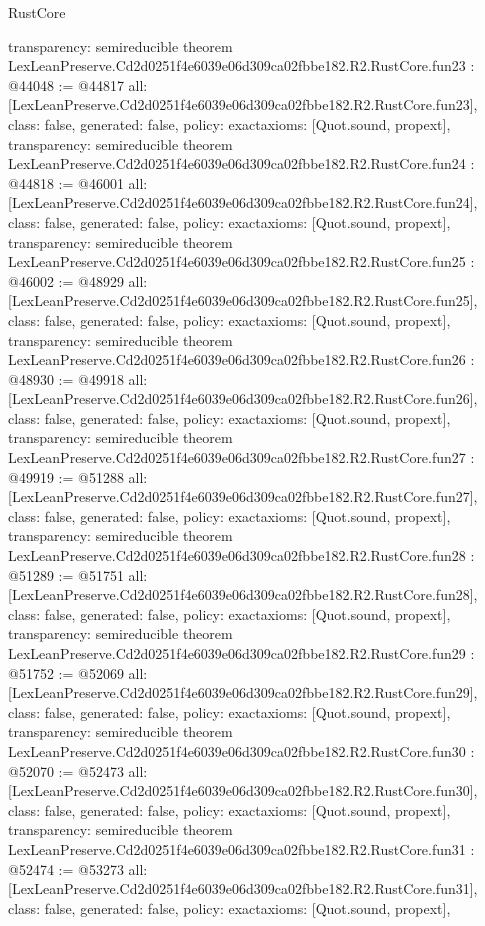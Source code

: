 \begin{lexlean}{RustCore}
\begin{coremodule}
{  transparency: semireducible
}
theorem LexLeanPreserve.Cd2d0251f4e6039e06d309ca02fbbe182.R2.RustCore.fun23 : @44048 := @44817 {
  all: [LexLeanPreserve.Cd2d0251f4e6039e06d309ca02fbbe182.R2.RustCore.fun23],
  class: false,
  generated: false,
  policy: exact{axioms: [Quot.sound, propext]},
  transparency: semireducible
}
theorem LexLeanPreserve.Cd2d0251f4e6039e06d309ca02fbbe182.R2.RustCore.fun24 : @44818 := @46001 {
  all: [LexLeanPreserve.Cd2d0251f4e6039e06d309ca02fbbe182.R2.RustCore.fun24],
  class: false,
  generated: false,
  policy: exact{axioms: [Quot.sound, propext]},
  transparency: semireducible
}
theorem LexLeanPreserve.Cd2d0251f4e6039e06d309ca02fbbe182.R2.RustCore.fun25 : @46002 := @48929 {
  all: [LexLeanPreserve.Cd2d0251f4e6039e06d309ca02fbbe182.R2.RustCore.fun25],
  class: false,
  generated: false,
  policy: exact{axioms: [Quot.sound, propext]},
  transparency: semireducible
}
theorem LexLeanPreserve.Cd2d0251f4e6039e06d309ca02fbbe182.R2.RustCore.fun26 : @48930 := @49918 {
  all: [LexLeanPreserve.Cd2d0251f4e6039e06d309ca02fbbe182.R2.RustCore.fun26],
  class: false,
  generated: false,
  policy: exact{axioms: [Quot.sound, propext]},
  transparency: semireducible
}
theorem LexLeanPreserve.Cd2d0251f4e6039e06d309ca02fbbe182.R2.RustCore.fun27 : @49919 := @51288 {
  all: [LexLeanPreserve.Cd2d0251f4e6039e06d309ca02fbbe182.R2.RustCore.fun27],
  class: false,
  generated: false,
  policy: exact{axioms: [Quot.sound, propext]},
  transparency: semireducible
}
theorem LexLeanPreserve.Cd2d0251f4e6039e06d309ca02fbbe182.R2.RustCore.fun28 : @51289 := @51751 {
  all: [LexLeanPreserve.Cd2d0251f4e6039e06d309ca02fbbe182.R2.RustCore.fun28],
  class: false,
  generated: false,
  policy: exact{axioms: [Quot.sound, propext]},
  transparency: semireducible
}
theorem LexLeanPreserve.Cd2d0251f4e6039e06d309ca02fbbe182.R2.RustCore.fun29 : @51752 := @52069 {
  all: [LexLeanPreserve.Cd2d0251f4e6039e06d309ca02fbbe182.R2.RustCore.fun29],
  class: false,
  generated: false,
  policy: exact{axioms: [Quot.sound, propext]},
  transparency: semireducible
}
theorem LexLeanPreserve.Cd2d0251f4e6039e06d309ca02fbbe182.R2.RustCore.fun30 : @52070 := @52473 {
  all: [LexLeanPreserve.Cd2d0251f4e6039e06d309ca02fbbe182.R2.RustCore.fun30],
  class: false,
  generated: false,
  policy: exact{axioms: [Quot.sound, propext]},
  transparency: semireducible
}
theorem LexLeanPreserve.Cd2d0251f4e6039e06d309ca02fbbe182.R2.RustCore.fun31 : @52474 := @53273 {
  all: [LexLeanPreserve.Cd2d0251f4e6039e06d309ca02fbbe182.R2.RustCore.fun31],
  class: false,
  generated: false,
  policy: exact{axioms: [Quot.sound, propext]},
}
\end{coremodule}
\end{lexlean}
